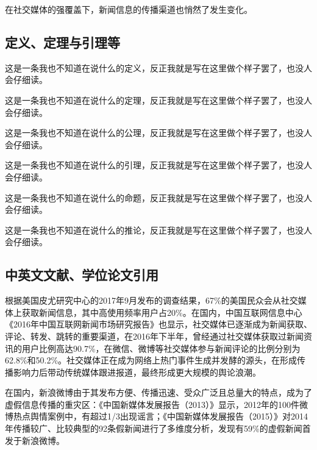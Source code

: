 \documentclass[a4paper,AutoFakeBold,oneside,12pt]{book}
\begin{document}
在社交媒体的强覆盖下，新闻信息的传播渠道也悄然了发生变化。\cite{false_news_spread_2018}

\subsection{定义、定理与引理等}
\begin{definition}
	这是一条我也不知道在说什么的定义，反正我就是写在这里做个样子罢了，也没人会仔细读。\cite{周兴2017基于深度学习的谣言检测及模式挖掘}
\end{definition}

\begin{theorem}
	这是一条我也不知道在说什么的定理，反正我就是写在这里做个样子罢了，也没人会仔细读。
\end{theorem}

\begin{axiom}
	这是一条我也不知道在说什么的公理，反正我就是写在这里做个样子罢了，也没人会仔细读。
\end{axiom}

\begin{lemma}
	这是一条我也不知道在说什么的引理，反正我就是写在这里做个样子罢了，也没人会仔细读。
\end{lemma}

\begin{proposition}
	这是一条我也不知道在说什么的命题，反正我就是写在这里做个样子罢了，也没人会仔细读。
\end{proposition}

\begin{corollary}
	这是一条我也不知道在说什么的推论，反正我就是写在这里做个样子罢了，也没人会仔细读。
\end{corollary}

\subsection{中英文文献、学位论文引用}
根据美国皮尤研究中心的2017年9月发布的调查结果\cite{pew_news_use_2017}，67\%的美国民众会从社交媒体上获取新闻信息，其中高使用频率用户占20\%。在国内，中国互联网信息中心《2016年中国互联网新闻市场研究报告》\cite{internet_news_2016}也显示，社交媒体已逐渐成为新闻获取、评论、转发、跳转的重要渠道，在2016年下半年，曾经通过社交媒体获取过新闻资讯的用户比例高达90.7\%，在微信、微博等社交媒体参与新闻评论的比例分别为62.8\%和50.2\%。社交媒体正在成为网络上热门事件生成并发酵的源头，在形成传播影响力后带动传统媒体跟进报道，最终形成更大规模的舆论浪潮。\cite{Yang2012Automatic}

在国内，新浪微博由于其发布方便、传播迅速、受众广泛且总量大的特点，成为了虚假信息传播的重灾区：《中国新媒体发展报告（2013）》\cite{唐绪军2013中国新媒体发展报告}显示，2012年的100件微博热点舆情案例中，有超过1/3出现谣言；《中国新媒体发展报告（2015）》\cite{唐绪军2015中国新媒体发展报告}对2014年传播较广、比较典型的92条假新闻进行了多维度分析，发现有59\%的虚假新闻首发于新浪微博。
\end{document}
